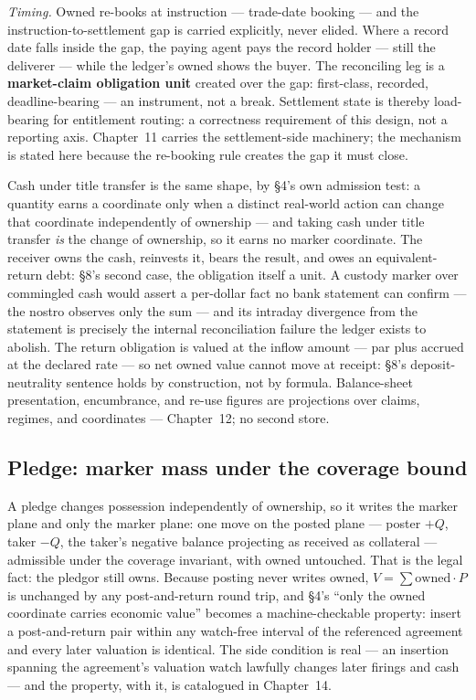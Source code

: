 \emph{Timing.} Owned re-books at instruction --- trade-date booking --- and
the instruction-to-settlement gap is carried explicitly, never elided. Where a
record date falls inside the gap, the paying agent pays the record holder ---
still the deliverer --- while the ledger's owned shows the buyer. The
reconciling leg is a \textbf{market-claim obligation unit} created over the
gap: first-class, recorded, deadline-bearing --- an instrument, not a break.
Settlement state is thereby load-bearing for entitlement routing: a
correctness requirement of this design, not a reporting axis. Chapter~11
carries the settlement-side machinery; the mechanism is stated here because
the re-booking rule creates the gap it must close.

Cash under title transfer is the same shape, by \S4's own admission test: a
quantity earns a coordinate only when a distinct real-world action can change
that coordinate independently of ownership --- and taking cash under title
transfer \emph{is} the change of ownership, so it earns no marker coordinate.
The receiver owns the cash, reinvests it, bears the result, and owes an
equivalent-return debt: \S8's second case, the obligation itself a unit. A
custody marker over commingled cash would assert a per-dollar fact no bank
statement can confirm --- the nostro observes only the sum --- and its
intraday divergence from the statement is precisely the internal
reconciliation failure the ledger exists to abolish. The return obligation is
valued at the inflow amount --- par plus accrued at the declared rate --- so
net owned value cannot move at receipt: \S8's deposit-neutrality sentence
holds by construction, not by formula. Balance-sheet presentation, encumbrance,
and re-use figures are projections over claims, regimes, and coordinates ---
Chapter~12; no second store.

\subsection{Pledge: marker mass under the coverage bound}

A pledge changes possession independently of ownership, so it writes the
marker plane and only the marker plane: one move on the posted plane ---
poster $+Q$, taker $-Q$, the taker's negative balance projecting as received
as collateral --- admissible under the coverage invariant, with owned
untouched. That is the legal fact: the pledgor still owns. Because posting
never writes owned, $V=\sum \mathrm{owned}\cdot P$ is unchanged by any
post-and-return round trip, and \S4's ``only the owned coordinate carries
economic value'' becomes a machine-checkable property: insert a
post-and-return pair within any watch-free interval of the referenced
agreement and every later valuation is identical. The side condition is real
--- an insertion spanning the agreement's valuation watch lawfully changes
later firings and cash --- and the property, with it, is catalogued in
Chapter~14.

